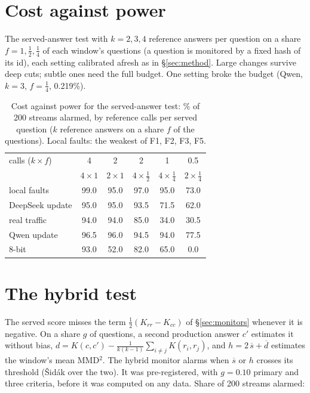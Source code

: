 \documentclass[11pt]{article}
\begin{document}
\section{Cost against power}
\label{app:costpower}

The served-answer test with $k=2,3,4$ reference answers per question on a share
$f=1,\tfrac12,\tfrac14$ of each window's questions (a question is monitored by a
fixed hash of its id), each setting calibrated afresh as in \S\ref{sec:method}.
Large changes survive deep cuts; subtle ones need the full budget. One setting
broke the budget (Qwen, $k=3$, $f=\tfrac14$, 0.219\%).

\begin{table}[h]
  \centering\small
  \caption{Cost against power for the served-answer test: \% of 200 streams
  alarmed, by reference calls per served question ($k$ reference answers on a share
  $f$ of the questions). Local faults: the weakest of F1, F2, F3, F5.}
  \label{tab:costpower}
  \setlength{\tabcolsep}{3.2pt}
  \begin{tabular}{lccccc}
    \toprule
    calls ($k\times f$) & 4 & 2 & 2 & 1 & 0.5 \\
    & \scriptsize $4\times1$ & \scriptsize $2\times1$ & \scriptsize $4\times\frac12$ & \scriptsize $4\times\frac14$ & \scriptsize $2\times\frac14$ \\
    \midrule
    local faults & 99.0 & 95.0 & 97.0 & 95.0 & 73.0 \\
    DeepSeek update & 95.0 & 95.0 & 93.5 & 71.5 & 62.0 \\
    \quad real traffic & 94.0 & 94.0 & 85.0 & 34.0 & 30.5 \\
    Qwen update & 96.5 & 96.0 & 94.5 & 94.0 & 77.5 \\
    8-bit & 93.0 & 52.0 & 82.0 & 65.0 & 0.0 \\
    \bottomrule
  \end{tabular}
\end{table}

\section{The hybrid test}
\label{app:hybrid}

The served score misses the term $\tfrac12(K_{rr}-K_{cc})$ of
\S\ref{sec:monitors} whenever it is negative. On a share $g$ of questions, a second
production answer $c'$ estimates it without bias,
$d=K(c,c')-\tfrac{1}{k(k-1)}\sum_{i\neq j}K(r_i,r_j)$, and
$h=2\,\overline{s}+\overline{d}$ estimates the window's mean MMD$^2$. The hybrid
monitor alarms when $\overline{s}$ or $h$ crosses its threshold (Šidák over the two).
It was pre-registered, with $g=0.10$ primary and three criteria, before it was
computed on any data. Share of 200 streams alarmed:
\end{document}
